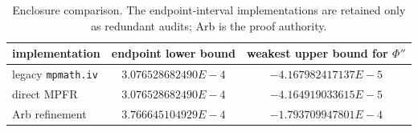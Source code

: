 \begin{table}[t]
\centering
\small
\begin{tabular}{lcc}
\toprule
implementation & endpoint lower bound & weakest upper bound for $\Phi''$ \\
\midrule
legacy \texttt{mpmath.iv} & $3.076528682490E-4$ & $-4.167982417137E-5$ \\
direct MPFR & $3.076528682490E-4$ & $-4.164919033615E-5$ \\
Arb refinement & $3.766645104929E-4$ & $-1.793709947801E-4$ \\
\bottomrule
\end{tabular}
\caption{Enclosure comparison.  The endpoint-interval implementations are retained only as redundant audits; Arb is the proof authority.}
\label{tab:enclosure-reconciliation}
\end{table}
